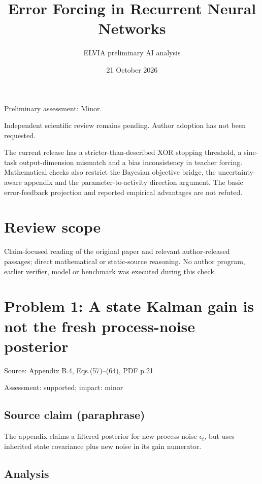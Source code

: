 \documentclass[11pt]{article}
\begin{document}
\title{Error Forcing in Recurrent Neural Networks}

\author{ELVIA preliminary AI analysis}\date{21 October 2026}\maketitle

Preliminary assessment: Minor.\par

Independent scientific review remains pending. Author adoption has not been requested.

The current release has a stricter-than-described XOR stopping threshold, a sine-task output-dimension mismatch and a bias inconsistency in teacher forcing. Mathematical checks also restrict the Bayesian objective bridge, the uncertainty-aware appendix and the parameter-to-activity direction argument. The basic error-feedback projection and reported empirical advantages are not refuted.

\section*{Review scope}

Claim-focused reading of the original paper and relevant author-released passages; direct mathematical or static-source reasoning. No author program, earlier verifier, model or benchmark was executed during this check.

\section*{Problem 1: A state Kalman gain is not the fresh process-noise posterior}

Source: Appendix B.4, Eqs.(57)–(64), PDF p.21

Assessment: supported; impact: minor

\subsection*{Source claim (paraphrase)}

The appendix claims a filtered posterior for new process noise \(\epsilon_t\), but uses inherited state covariance plus new noise in its gain numerator.

\subsection*{Analysis}
\end{document}
